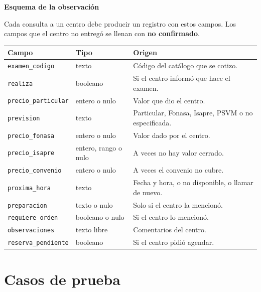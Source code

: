 \documentclass[11pt,a4paper]{article}
\newenvironment{CajaDatos}
  {\par\medskip\begin{lrbox}{\boxdatos}%
   \begin{minipage}{0.92\textwidth}\small}
  {\end{minipage}\end{lrbox}%
   \noindent\setlength{\fboxsep}{8pt}\setlength{\fboxrule}{0.8pt}%
   \fcolorbox{colverde}{fondoverde}{\usebox{\boxdatos}}\par\medskip}
\newcommand{\boxtitle}[1]{\textbf{\color{headcol}#1}\par\vspace{2pt}}
\newcommand{\codigo}[1]{\texttt{#1}}
\begin{document}
\begin{CajaDatos}
\boxtitle{Esquema de la observación}
Cada consulta a un centro debe producir un registro con estos campos. Los
campos que el centro no entregó se llenan con \textbf{no confirmado}.

\begin{center}
\small
\begin{tabularx}{\textwidth}{@{}p{3.7cm}p{3.0cm}X@{}}
\toprule
\rowcolor{fondotabla}\textbf{Campo} & \textbf{Tipo} & \textbf{Origen} \\
\midrule
\codigo{examen\_codigo} & texto & Código del catálogo que se cotizo. \\
\codigo{realiza} & booleano & Si el centro informó que hace el examen. \\
\codigo{precio\_particular} & entero o nulo & Valor que dio el centro. \\
\codigo{prevision} & texto & Particular, Fonasa, Isapre, PSVM o
  no especificada. \\
\codigo{precio\_fonasa} & entero o nulo & Valor dado por el centro. \\
\codigo{precio\_isapre} & entero, rango o nulo & A veces no hay valor
  cerrado. \\
\codigo{precio\_convenio} & entero o nulo & A veces el convenio no cubre. \\
\codigo{proxima\_hora} & texto & Fecha y hora, o no disponible, o llamar de
  nuevo. \\
\codigo{preparacion} & texto o nulo & Solo si el centro la mencionó. \\
\codigo{requiere\_orden} & booleano o nulo & Si el centro lo mencionó. \\
\codigo{observaciones} & texto libre & Comentarios del centro. \\
\codigo{reserva\_pendiente} & booleano & Si el centro pidió agendar. \\
\bottomrule
\end{tabularx}
\end{center}
\end{CajaDatos}

\section{Casos de prueba}
\end{document}
